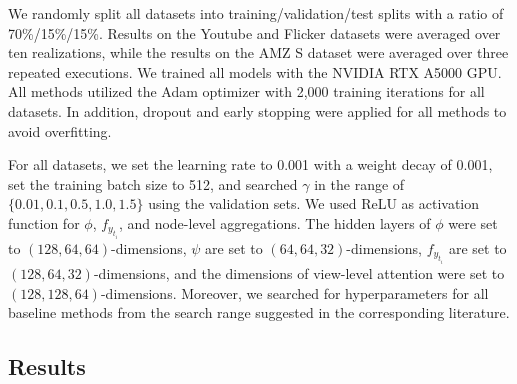 \documentclass[runningheads]{llncs}
\begin{document}
We randomly split all datasets into training/validation/test splits  with a ratio of 70\%/15\%/15\%. Results on the Youtube and Flicker datasets were averaged over ten realizations, while the results on the AMZ S dataset were averaged over three repeated executions. We trained all models with the NVIDIA RTX A5000 GPU. All methods utilized the Adam optimizer with 2,000 training iterations for all datasets. In addition, dropout and early stopping were applied for all methods to avoid overfitting.



For all datasets, we set the learning rate to 0.001 with a weight decay of 0.001, set the training batch size to 512, and searched $\gamma$ in the range of $\{0.01,0.1,0.5,1.0,1.5\}$ using the validation sets. We used ReLU as activation function for $\phi$, $f_{y_{t_i}}$, and node-level aggregations. The hidden layers of $\phi$ were set to $(128,64,64)$-dimensions,  $\psi$ are set to $(64,64,32)$-dimensions,  $f_{y_{t_i}}$ are set to $(128,64,32)$-dimensions, and the dimensions of view-level attention were set to $(128,128,64)$-dimensions.  Moreover, we  searched for hyperparameters for all baseline methods from the search range suggested in the corresponding literature.



\subsection{Results}
\end{document}
